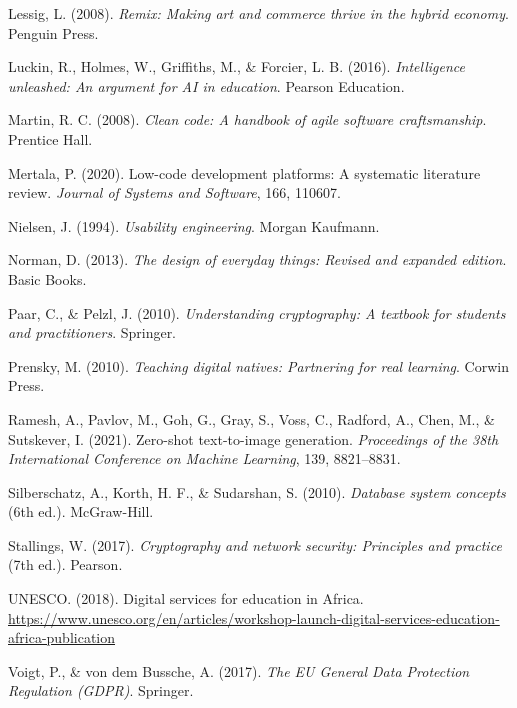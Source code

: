 \documentclass[12pt,a4paper]{report}
\begin{document}
\begin{thebibliography}{99}
Lessig, L. (2008). \textit{Remix: Making art and commerce thrive in the hybrid economy}. Penguin Press.

Luckin, R., Holmes, W., Griffiths, M., \& Forcier, L. B. (2016). \textit{Intelligence unleashed: An argument for AI in education}. Pearson Education.

Martin, R. C. (2008). \textit{Clean code: A handbook of agile software craftsmanship}. Prentice Hall.

Mertala, P. (2020). Low-code development platforms: A systematic literature review. \textit{Journal of Systems and Software}, 166, 110607.

Nielsen, J. (1994). \textit{Usability engineering}. Morgan Kaufmann.

Norman, D. (2013). \textit{The design of everyday things: Revised and expanded edition}. Basic Books.

Paar, C., \& Pelzl, J. (2010). \textit{Understanding cryptography: A textbook for students and practitioners}. Springer.

Prensky, M. (2010). \textit{Teaching digital natives: Partnering for real learning}. Corwin Press.

Ramesh, A., Pavlov, M., Goh, G., Gray, S., Voss, C., Radford, A., Chen, M., \& Sutskever, I. (2021). Zero-shot text-to-image generation. \textit{Proceedings of the 38th International Conference on Machine Learning}, 139, 8821–8831.

Silberschatz, A., Korth, H. F., \& Sudarshan, S. (2010). \textit{Database system concepts} (6th ed.). McGraw-Hill.

Stallings, W. (2017). \textit{Cryptography and network security: Principles and practice} (7th ed.). Pearson.

UNESCO. (2018). Digital services for education in Africa. \url{https://www.unesco.org/en/articles/workshop-launch-digital-services-education-africa-publication}

Voigt, P., \& von dem Bussche, A. (2017). \textit{The EU General Data Protection Regulation (GDPR)}. Springer.

\end{thebibliography}
\end{document}
